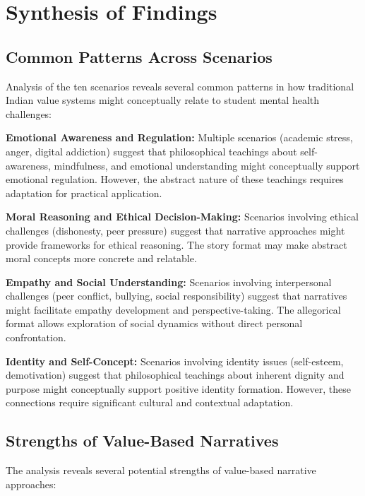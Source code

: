 \documentclass[12pt,a4paper,twocolumn]{article}
\begin{document}
\section{Synthesis of Findings}

\subsection{Common Patterns Across Scenarios}

Analysis of the ten scenarios reveals several common patterns in how traditional Indian value systems might conceptually relate to student mental health challenges:

\textbf{Emotional Awareness and Regulation:} Multiple scenarios (academic stress, anger, digital addiction) suggest that philosophical teachings about self-awareness, mindfulness, and emotional understanding might conceptually support emotional regulation. However, the abstract nature of these teachings requires adaptation for practical application.

\textbf{Moral Reasoning and Ethical Decision-Making:} Scenarios involving ethical challenges (dishonesty, peer pressure) suggest that narrative approaches might provide frameworks for ethical reasoning. The story format may make abstract moral concepts more concrete and relatable.

\textbf{Empathy and Social Understanding:} Scenarios involving interpersonal challenges (peer conflict, bullying, social responsibility) suggest that narratives might facilitate empathy development and perspective-taking. The allegorical format allows exploration of social dynamics without direct personal confrontation.

\textbf{Identity and Self-Concept:} Scenarios involving identity issues (self-esteem, demotivation) suggest that philosophical teachings about inherent dignity and purpose might conceptually support positive identity formation. However, these connections require significant cultural and contextual adaptation.

\subsection{Strengths of Value-Based Narratives}

The analysis reveals several potential strengths of value-based narrative approaches:
\end{document}
